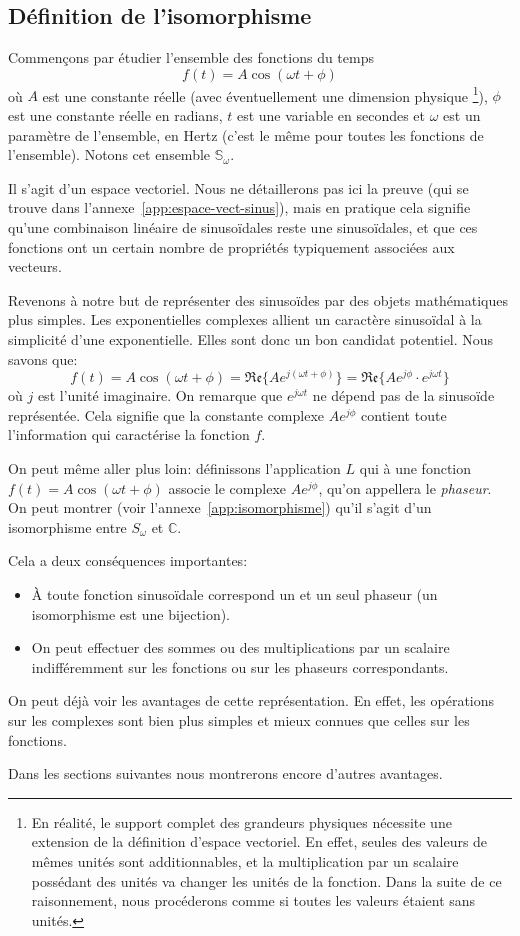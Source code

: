 \subsection{Définition de l'isomorphisme}
Commençons par étudier l'ensemble des fonctions du temps
\[
    f(t) = A\cos(\omega t + \phi)
\]
où $A$ est une constante réelle (avec éventuellement une dimension physique
\footnote{
    En réalité, le support complet des grandeurs physiques
    nécessite une extension de la définition d'espace vectoriel.
    En effet, seules des valeurs de mêmes unités sont additionnables,
    et la multiplication par un scalaire possédant des unités
    va changer les unités de la fonction.
    Dans la suite de ce raisonnement,
    nous procéderons comme si toutes les valeurs étaient sans unités.
}),
$\phi$ est une constante réelle en radians,
$t$ est une variable en secondes
et $\omega$ est un paramètre de l'ensemble, en Hertz
(c'est le même pour toutes les fonctions de l'ensemble).
Notons cet ensemble $\mathbb{S}_\omega$.

Il s'agit d'un espace vectoriel.
Nous ne détaillerons pas ici la preuve
(qui se trouve dans l'annexe~\ref{app:espace-vect-sinus}),
mais en pratique cela signifie qu'une combinaison linéaire
de sinusoïdales reste une sinusoïdales,
et que ces fonctions ont un certain nombre de propriétés
typiquement associées aux vecteurs.

Revenons à notre but de représenter des sinusoïdes
par des objets mathématiques plus simples.
Les exponentielles complexes allient un caractère sinusoïdal à
la simplicité d'une exponentielle.
Elles sont donc un bon candidat potentiel.
Nous savons que:
\[
    f(t) = A\cos(\omega t + \phi) = \mathfrak{Re}\{Ae^{j(\omega t + \phi)}\}
    = \mathfrak{Re}\{Ae^{j\phi}\cdot e^{j\omega t}\}
\]
où $j$ est l'unité imaginaire.
On remarque que $e^{j\omega t}$ ne dépend pas de la sinusoïde représentée.
Cela signifie que la constante complexe $Ae^{j\phi}$ contient
toute l'information qui caractérise la fonction $f$.

On peut même aller plus loin: définissons l'application $L$
qui à une fonction $f(t) = A\cos(\omega t + \phi)$
associe le complexe $Ae^{j\phi}$,
qu'on appellera le \emph{phaseur}.
On peut montrer (voir l'annexe~\ref{app:isomorphisme}) qu'il s'agit d'un
isomorphisme entre $S_\omega$ et $\mathbb{C}$.

Cela a deux conséquences importantes:
\begin{itemize}
    \item À toute fonction sinusoïdale correspond un et un seul phaseur
        (un isomorphisme est une bijection).
    \item On peut effectuer des sommes ou des multiplications par un scalaire
        indifféremment sur les fonctions ou sur les phaseurs correspondants.
\end{itemize}

On peut déjà voir les avantages de cette représentation.
En effet,
les opérations sur les complexes sont bien plus simples et mieux connues
que celles sur les fonctions.

Dans les sections suivantes nous montrerons
encore d'autres avantages.
